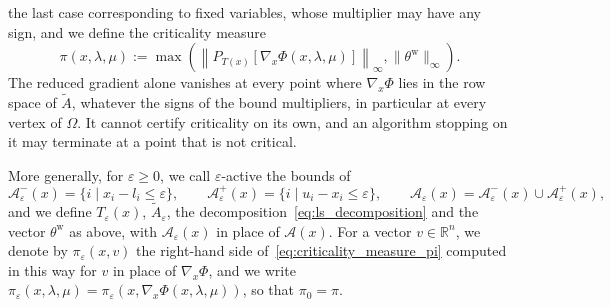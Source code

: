 \documentclass{article}
\numberwithin{equation}{section}
\newcommand{\RR}{{\mathbb{R}}} %
\newcommand{\calA}{{\mathcal{A}}}
\newcommand{\proj}[2]{P_{#1} \left[ {#2} \right]} %
\theoremstyle{plain}
\begin{document}
the last case corresponding to fixed variables, whose multiplier may have any sign, and we define the criticality measure
\begin{equation}\label{eq:criticality_measure_pi}
	\pi(x,\lambda,\mu) := \max\left( \left\|\proj{T(x)}{\nabla_x\Phi(x,\lambda,\mu)}\right\|_\infty, \|\theta^{\mathrm{w}}\|_\infty \right).
\end{equation}
The reduced gradient alone vanishes at every point where $\nabla_x\Phi$ lies in the row space of $\tilde{A}$, whatever the signs of the bound multipliers, in particular at every vertex of $\Omega$. It cannot certify criticality on its own, and an algorithm stopping on it may terminate at a point that is not critical.

More generally, for $\varepsilon \ge 0$, we call $\varepsilon$-active the bounds of
\[\calA^-_\varepsilon(x) = \{i \mid x_i - l_i \le \varepsilon\}, \qquad \calA^+_\varepsilon(x) = \{i \mid u_i - x_i \le \varepsilon\}, \qquad \calA_\varepsilon(x) = \calA^-_\varepsilon(x)\cup\calA^+_\varepsilon(x),\]
and we define $T_\varepsilon(x)$, $\tilde{A}_\varepsilon$, the decomposition~\eqref{eq:ls_decomposition} and the vector $\theta^{\mathrm{w}}$ as above, with $\calA_\varepsilon(x)$ in place of $\calA(x)$. For a vector $v \in \RR^n$, we denote by $\pi_\varepsilon(x,v)$ the right-hand side of~\eqref{eq:criticality_measure_pi} computed in this way for $v$ in place of $\nabla_x\Phi$, and we write $\pi_\varepsilon(x,\lambda,\mu) = \pi_\varepsilon(x,\nabla_x\Phi(x,\lambda,\mu))$, so that $\pi_0 = \pi$.
\end{document}
